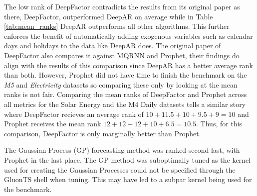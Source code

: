 The low rank of DeepFactor contradicts the results from its original paper as there, DeepFactor, outperformed DeepAR on average while in Table \ref{tab:mean_ranks} DeepAR outperforms all other algorithms. This further enforces the benefit of automatically adding exogenous variables such as calendar days and holidays to the data like DeepAR does. The original paper of DeepFactor also compares it against MQRNN and Prophet, their findings do align with the results of this comparison since DeepAR has a better average rank than both. However, Prophet did not have time to finish the benchmark on the \textit{M5} and \textit{Electricity} datasets so comparing these only by looking at the mean ranks is not fair. Comparing the mean ranks of DeepFactor and Prophet across all metrics for the Solar Energy and the M4 Daily datasets tells a similar story where DeepFactor recieves an average rank of \(10+11.5+10+9.5+9=10\) and Prophet receives the mean rank \(12+12+12+10+6.5=10.5\). Thus, for this comparison, DeepFactor is only marginally better than Prophet.

The Gaussian Process (GP) forecasting method was ranked second last, with Prophet in the last place. The GP method was suboptimally tuned as the kernel used for creating the Gaussian Processes could not be specified through the GluonTS shell when tuning. This may have led to a subpar kernel being used for the benchmark.

